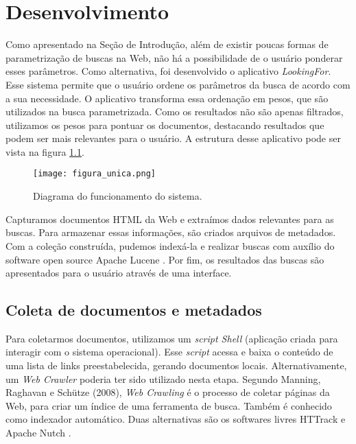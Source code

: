 \chapter{Desenvolvimento}
\label{cap:desenvolvimento}

Como apresentado na Seção de Introdução, além de existir poucas formas de parametrização de buscas na Web, não há a possibilidade de o usuário ponderar esses parâmetros. Como alternativa, foi desenvolvido o aplicativo \emph{LookingFor}. Esse sistema permite que o usuário ordene os parâmetros da busca de acordo com a sua necessidade. O aplicativo transforma essa ordenação em pesos, que são utilizados na busca parametrizada. Como os resultados não são apenas filtrados, utilizamos os pesos para pontuar os documentos, destacando resultados que podem ser mais relevantes para o usuário.
A estrutura desse aplicativo pode ser vista na figura \ref{fig:diagsis}.

\begin{figure}[!h]
  \centering
  \texttt{[image: figura\_unica.png]} 
  \caption{Diagrama do funcionamento do sistema.}
  \label{fig:diagsis} 
\end{figure}

Capturamos documentos HTML da Web e extraímos dados relevantes para as buscas. Para armazenar essas informações, são criados arquivos de metadados. Com a coleção construída, pudemos indexá-la e realizar buscas com auxílio do software open source Apache Lucene \cite{ApacheLucene}. Por fim, os resultados das buscas são apresentados para o usuário através de uma interface.


\section{Coleta de documentos e metadados}
\label{sec:coletaDocs}

Para coletarmos documentos, utilizamos um \emph{script Shell} (aplicação criada para interagir com o sistema operacional). Esse \emph{script} acessa e baixa o conteúdo de uma lista de links preestabelecida, gerando documentos locais. Alternativamente, um \emph{Web Crawler} poderia ter sido utilizado nesta etapa. Segundo Manning, Raghavan e Schütze (2008), \emph{Web Crawling} é o processo de coletar páginas da Web, para criar um índice de uma ferramenta de busca. Também é conhecido como indexador automático. Duas alternativas são os softwares livres HTTrack \cite{HTTrack} e Apache Nutch \cite{ApacheNutch}.

